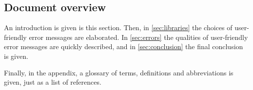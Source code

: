 \subsection{Document overview}
An introduction is given is this section.
Then, in \autoref{sec:libraries} the choices of user-friendly error messages are elaborated.
In \autoref{sec:errors} the qualities of user-friendly error messages are quickly described, and in \autoref{sec:conclusion} the final conclusion is given.

Finally, in the appendix, a glossary of terms, definitions and abbreviations is given, just as a list of references.
